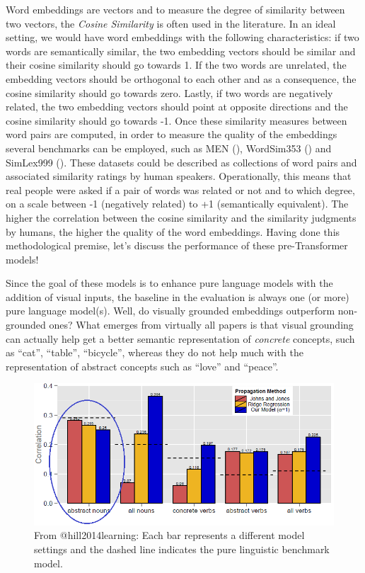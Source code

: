 \documentclass[
]{krantz}
\begin{document}
Word embeddings are vectors and to measure the degree of similarity between two vectors, the \emph{Cosine Similarity} is often used in the literature. In an ideal setting, we would have word embeddings with the following characteristics: if two words are semantically similar, the two embedding vectors should be similar and their cosine similarity should go towards 1. If the two words are unrelated, the embedding vectors should be orthogonal to each other and as a consequence, the cosine similarity should go towards zero. Lastly, if two words are negatively related, the two embedding vectors should point at opposite directions and the cosine similarity should go towards -1.
Once these similarity measures between word pairs are computed, in order to measure the quality of the embeddings several benchmarks can be employed, such as MEN (\citet{bruni2014multimodal}), WordSim353 (\citet{agirre2009study}) and SimLex999 (\citet{hill2015simlex}). These datasets could be described as collections of word pairs and associated similarity ratings by human speakers. Operationally, this means that real people were asked if a pair of words was related or not and to which degree, on a scale between -1 (negatively related) to +1 (semantically equivalent). The higher the correlation between the cosine similarity and the similarity judgments by humans, the higher the quality of the word embeddings. Having done this methodological premise, let's discuss the performance of these pre-Transformer models!

Since the goal of these models is to enhance pure language models with the addition of visual inputs, the baseline in the evaluation is always one (or more) pure language model(s). Well, do visually grounded embeddings outperform non-grounded ones? What emerges from virtually all papers is that visual grounding can actually help get a better semantic representation of \emph{concrete} concepts, such as ``cat'', ``table'', ``bicycle'', whereas they do not help much with the representation of abstract concepts such as ``love'' and ``peace''.

\begin{figure}

{\centering \includegraphics[width=1\linewidth]{figures/02-03-img-support-text/img-2014hill-01} 

}

\caption{From @hill2014learning: Each bar represents a different model settings and the dashed line indicates the pure linguistic benchmark model.}\label{fig:img-2014hill-01}
\end{figure}
\end{document}
